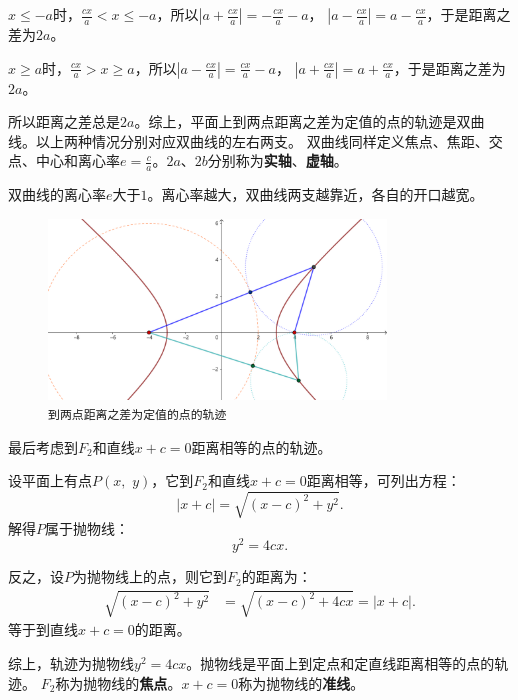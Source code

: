 \documentclass[12pt,UTF8]{ctexbook}
\begin{document}
$x \leqslant -a$时，$\frac{cx}{a} < x \leqslant -a$，所以$\left|a + \frac{cx}{a}\right| = -\frac{cx}{a} - a$，
$\left|a - \frac{cx}{a}\right| = a - \frac{cx}{a}$，于是距离之差为$2a$。

$x \geqslant a$时，$\frac{cx}{a} > x \geqslant a$，所以$\left|a - \frac{cx}{a}\right| = \frac{cx}{a} - a$，
$\left|a + \frac{cx}{a}\right| = a + \frac{cx}{a}$，于是距离之差为$2a$。

所以距离之差总是$2a$。综上，平面上到两点距离之差为定值的点的轨迹是双曲线。以上两种情况分别对应双曲线的左右两支。
双曲线同样定义焦点、焦距、交点、中心和离心率$\displaystyle e =\frac{c}{a}$。$2a$、$2b$分别称为\textbf{实轴}、\textbf{虚轴}。

双曲线的离心率$e$大于$1$。离心率越大，双曲线两支越靠近，各自的开口越宽。

\begin{figure}[h] 
    \centering
    \includegraphics[width=0.8\textwidth]{tu/双曲线第一定义.png}
    \caption*{\texttt{到两点距离之差为定值的点的轨迹}}
\end{figure}

最后考虑到$F_2$和直线$x + c = 0$距离相等的点的轨迹。

设平面上有点$P(x, \,\,y)$，它到$F_2$和直线$x + c = 0$距离相等，可列出方程：
$$ \left|x + c\right| = \sqrt{(x - c)^2 + y^2}.$$
解得$P$属于抛物线：
$$ y^2 = 4cx.$$

反之，设$P$为抛物线上的点，则它到$F_2$的距离为：
\begin{align*}
    \sqrt{(x - c)^2 + y^2} &= \sqrt{(x - c)^2 + 4cx} = |x + c|.
\end{align*}
等于到直线$x + c = 0$的距离。

综上，轨迹为抛物线$ y^2 = 4cx$。抛物线是平面上到定点和定直线距离相等的点的轨迹。
$F_2$称为抛物线的\textbf{焦点}。$x + c = 0$称为抛物线的\textbf{准线}。
\end{document}
